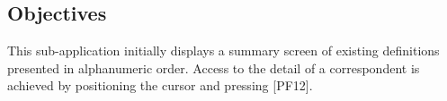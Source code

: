 \documentclass[letterpaper,10pt,english]{sphinxmanual}
\begin{document}

\subsection{Objectives}
\label{\detokenize{audit_operations_ and_performance:index-50}}\label{\detokenize{audit_operations_ and_performance:objectives}}
This sub-application initially displays a summary screen of existing definitions presented in alphanumeric order. Access
to the detail of a correspondent is achieved by positioning the cursor and pressing {[}PF12{]}.



\end{document}
